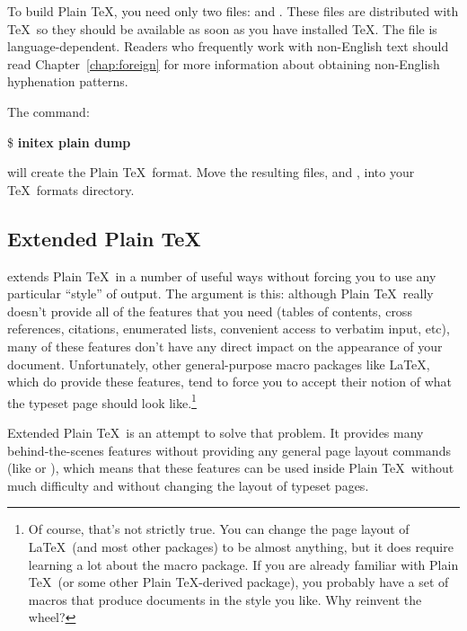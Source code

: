 To build Plain \TeX{}, you 
need only two files:  and
.  These 
files are distributed with \TeX\ so they
should be available as soon as you have installed \TeX.  
The  file is language-dependent.  Readers who frequently
work with non-English text should read Chapter~\ref{chap:foreign}
for more information about obtaining
non-English hyphenation patterns.

The command:

\begin{ttindent}
\$ \textbf{initex plain \bs{}dump}
\end{ttindent}

will create the Plain \TeX\ format.
Move the resulting 
files,  and
, into 
your \TeX\ formats directory.

\subsection{Extended Plain \protect\TeX}

 extends Plain \TeX\ in a number of
useful ways without forcing you to use any particular ``style'' of
output.
The argument is this: although Plain \TeX\ really doesn't provide all of the
features that you need (tables of contents, cross references, citations,
enumerated lists, convenient access to verbatim input, etc), many of these
features don't have any direct impact on the appearance of your document.
Unfortunately, other general-purpose macro packages like \LaTeX, which do
provide these features, tend to force you to accept their notion of what the
typeset page should look like.\footnote{Of course, that's not strictly true.
You can change the page layout of \LaTeX\ (and most other packages) to be
almost anything, but it does require learning a lot about the macro package.
If you are already familiar with Plain \TeX\ (or some other Plain \TeX-derived
package), you probably have a set of macros that produce documents in the
style you like.  Why reinvent the wheel?}

Extended Plain \TeX\ is an attempt to solve that problem.
It provides many behind-the-scenes features without providing any general
page layout commands (like  or ), which means
that these features can be used inside Plain \TeX\ without much difficulty 
and without
changing the layout of typeset pages.

